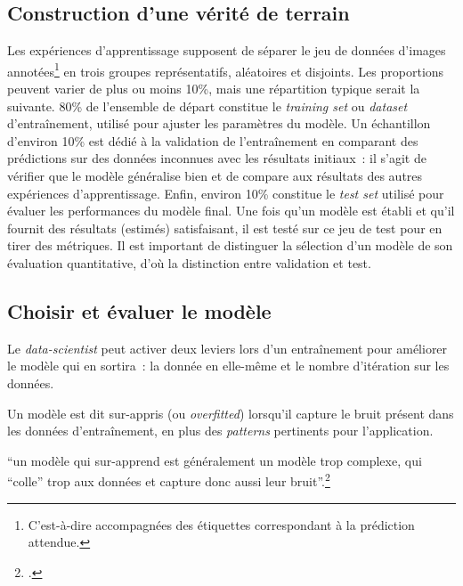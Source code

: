 \hypertarget{construction-dune-verite-de-terrain}{%
\subsection{Construction d'une vérité de
terrain}\label{construction-dune-verite-de-terrain}}

Les expériences d'apprentissage supposent de séparer le jeu de données
d'images annotées\footnote{C'est-à-dire accompagnées des étiquettes
  correspondant à la prédiction attendue.} en trois groupes
représentatifs, aléatoires et disjoints. Les proportions peuvent varier
de plus ou moins 10\%, mais une répartition typique serait la suivante.
80\% de l'ensemble de départ constitue le \emph{training set} ou \textit{dataset}
d'entraînement, utilisé pour ajuster les paramètres du modèle. Un
échantillon d'environ 10\% est dédié à la validation de l'entraînement
en comparant des prédictions sur des données inconnues avec les
résultats initiaux~: il s'agit de vérifier que le modèle généralise bien
et de compare aux résultats des autres expériences d'apprentissage.
Enfin, environ 10\% constitue le \emph{test set} utilisé pour évaluer
les performances du modèle final. Une fois qu'un modèle est établi et
qu'il fournit des résultats (estimés) satisfaisant, il est testé sur ce
jeu de test pour en tirer des métriques. Il est important de distinguer
la sélection d'un modèle de son évaluation quantitative, d'où la
distinction entre validation et test.

\hypertarget{choisir-et-evaluer-le-modele}{%
\subsection{Choisir et évaluer le
modèle}\label{choisir-et-evaluer-le-modele}}

Le \textit{data-scientist} peut activer deux leviers lors d'un entraînement pour
améliorer le modèle qui en sortira~: la donnée en elle-même et le nombre
d'itération sur les données.

Un modèle est dit sur-appris (ou \emph{overfitted}) lorsqu'il
capture le bruit présent dans les données d'entraînement, en plus des
\textit{patterns} pertinents pour l'application.

\begin{kwote}                                       
``un modèle qui sur-apprend est généralement un modèle trop complexe,
qui ``colle'' trop aux données et capture donc aussi leur
bruit''.\footcite[p.29]{azencott_introduction_2022}
                      \end{kwote}       

